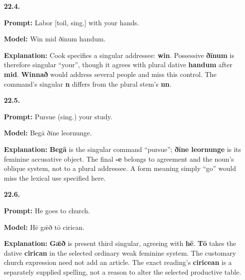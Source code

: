 \par\begin{minipage}{\linewidth}\raggedright
\textbf{22.4.}

\textbf{Prompt:} Labor [toil, sing.] with your hands.

\textbf{Model:} Win mid ðīnum handum.

\textbf{Explanation:} Cook specifies a singular addressee: \textbf{win}. Possessive \textbf{ðīnum} is therefore singular “your”, though it agrees with plural dative \textbf{handum} after \textbf{mid}. \textbf{Winnað} would address several people and miss this control. The command’s singular \textbf{n} differs from the plural stem’s \textbf{nn}.

\end{minipage}\par\addvspace{4pt}

\par\begin{minipage}{\linewidth}\raggedright
\textbf{22.5.}

\textbf{Prompt:} Pursue (sing.) your study.

\textbf{Model:} Begā ðīne leornunge.

\textbf{Explanation:} \textbf{Begā} is the singular command “pursue”; \textbf{ðīne leornunge} is its feminine accusative object. The final \textbf{-e} belongs to agreement and the noun’s oblique system, not to a plural addressee. A form meaning simply “go” would miss the lexical use specified here.

\end{minipage}\par\addvspace{4pt}

\par\begin{minipage}{\linewidth}\raggedright
\textbf{22.6.}

\textbf{Prompt:} He goes to church.

\textbf{Model:} Hē gǣð tō cirican.

\textbf{Explanation:} \textbf{Gǣð} is present third singular, agreeing with \textbf{hē}. \textbf{Tō} takes the dative \textbf{cirican} in the selected ordinary weak feminine system. The customary church expression need not add an article. The exact reading’s \textbf{ciricean} is a separately supplied spelling, not a reason to alter the selected productive table.

\end{minipage}\par\addvspace{4pt}

